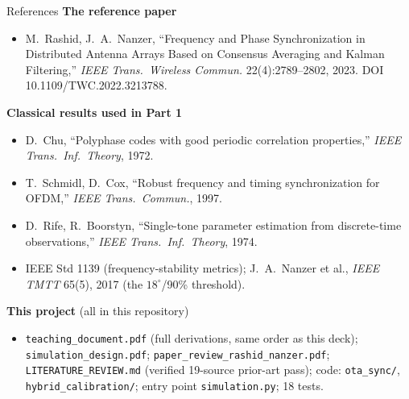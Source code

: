 \documentclass[10pt]{beamer}
\newcommand{\code}[1]{\texttt{#1}}
\begin{document}
\begin{frame}{References}
\footnotesize
\textbf{The reference paper}
\begin{itemize}
\item[{[RN23]}] M.~Rashid, J.~A.~Nanzer, ``Frequency and Phase
Synchronization in Distributed Antenna Arrays Based on Consensus
Averaging and Kalman Filtering,'' \emph{IEEE Trans.\ Wireless Commun.}
22(4):2789--2802, 2023. DOI 10.1109/TWC.2022.3213788.
\end{itemize}
\textbf{Classical results used in Part 1}
\begin{itemize}
\item D.~Chu, ``Polyphase codes with good periodic correlation
properties,'' \emph{IEEE Trans.\ Inf.\ Theory}, 1972.
\item T.~Schmidl, D.~Cox, ``Robust frequency and timing synchronization
for OFDM,'' \emph{IEEE Trans.\ Commun.}, 1997.
\item D.~Rife, R.~Boorstyn, ``Single-tone parameter estimation from
discrete-time observations,'' \emph{IEEE Trans.\ Inf.\ Theory}, 1974.
\item IEEE Std 1139 (frequency-stability metrics); J.~A.~Nanzer et al.,
\emph{IEEE TMTT} 65(5), 2017 (the $18^\circ$/90\% threshold).
\end{itemize}
\textbf{This project} (all in this repository)
\begin{itemize}
\item \code{teaching\_document.pdf} (full derivations, same order as
this deck); \code{simulation\_design.pdf};
\code{paper\_review\_rashid\_nanzer.pdf}; \code{LITERATURE\_REVIEW.md}
(verified 19-source prior-art pass); code: \code{ota\_sync/},
\code{hybrid\_calibration/}; entry point \code{simulation.py}; 18 tests.
\end{itemize}
\end{frame}
\end{document}
